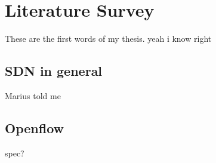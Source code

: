 \documentclass[article,12pt,a4paper]{report}
\begin{document}
\chapter{Literature Survey}
These are the first words of my thesis. yeah i know right
\section{SDN in general}
Marius told me
\section{Openflow}
spec?
\end{document}
